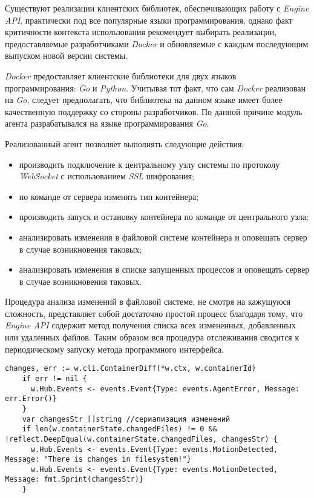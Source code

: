Существуют реализации клиентских библиотек, обеспечивающих работу с \textit{Engine API}, практически под все популярные языки программирования, однако факт критичности контекста использования рекомендует выбирать реализации, предоставляемые разработчиками \textit{Docker} и обновляемые с каждым последующим выпуском новой версии системы.

\textit{Docker} предоставляет клиентские библиотеки для двух языков программирования: \textit{Go} и \textit{Python}. Учитывая тот факт, что сам \textit{Docker} реализован на \textit{Go}, следует предполагать, что библиотека на данном языке имеет более качественную поддержку со стороны разработчиков. По данной причине модуль агента разрабатывался на языке программирования \textit{Go}.

Реализованный агент позволяет выполнять следующие действия:
\begin{itemize}
\item производить подключение к центральному узлу системы по протоколу \textit{WebSocket} с использованием \textit{SSL} шифрования;
\item по команде от сервера изменять тип контейнера;
\item производить запуск и остановку контейнера по команде от центрального узла;
\item анализировать изменения в файловой системе контейнера и оповещать сервер в случае возникновения таковых;
\item анализировать изменения в списке запущенных процессов и оповещать сервер в случае возникновения таковых.
\end{itemize}

Процедура анализа изменений в файловой системе, не смотря на кажущуюся сложность, представляет собой достаточно простой процесс благодаря тому, что \textit{Engine API} содержит метод получения списка всех измененных, добавленных или удаленных файлов. Таким образом вся процедура отслеживания сводится к периодическому запуску метода программного интерфейса.

\begin{lstlisting}[style=gostyle]
	changes, err := w.cli.ContainerDiff(*w.ctx, w.containerId)
	if err != nil {
	  w.Hub.Events <- events.Event{Type: events.AgentError, Message: err.Error()}
	}
	var changesStr []string //сериализация изменений
	if len(w.containerState.changedFiles) != 0 && !reflect.DeepEqual(w.containerState.changedFiles, changesStr) {
	  w.Hub.Events <- events.Event{Type: events.MotionDetected, Message: "There is changes in filesystem!"}
	  w.Hub.Events <- events.Event{Type: events.MotionDetected, Message: fmt.Sprint(changesStr)}
	}
\end{lstlisting}

